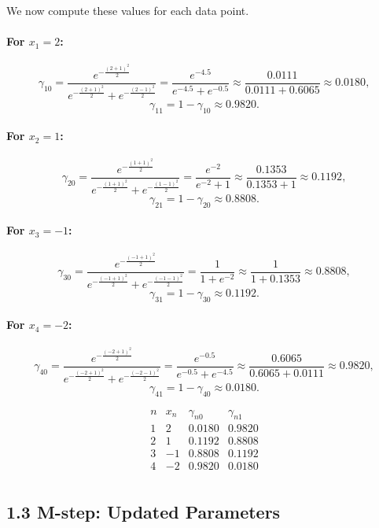 \documentclass{article}
\begin{document}
We now compute these values for each data point.

\paragraph{For $x_1 = 2$:}
\[
\gamma_{10}
= \frac{e^{-\frac{(2+1)^2}{2}}}{e^{-\frac{(2+1)^2}{2}} + e^{-\frac{(2-1)^2}{2}}}
= \frac{e^{-4.5}}{e^{-4.5}+e^{-0.5}}
\approx \frac{0.0111}{0.0111+0.6065}
\approx 0.0180,
\]
\[
\gamma_{11} = 1 - \gamma_{10} \approx 0.9820.
\]

\paragraph{For $x_2 = 1$:}
\[
\gamma_{20}
= \frac{e^{-\frac{(1+1)^2}{2}}}{e^{-\frac{(1+1)^2}{2}} + e^{-\frac{(1-1)^2}{2}}}
= \frac{e^{-2}}{e^{-2}+1}
\approx \frac{0.1353}{0.1353+1}
\approx 0.1192,
\]
\[
\gamma_{21} = 1 - \gamma_{20} \approx 0.8808.
\]

\paragraph{For $x_3 = -1$:}
\[
\gamma_{30}
= \frac{e^{-\frac{(-1+1)^2}{2}}}{e^{-\frac{(-1+1)^2}{2}} + e^{-\frac{(-1-1)^2}{2}}}
= \frac{1}{1+e^{-2}}
\approx \frac{1}{1+0.1353}
\approx 0.8808,
\]
\[
\gamma_{31} = 1 - \gamma_{30} \approx 0.1192.
\]

\paragraph{For $x_4 = -2$:}
\[
\gamma_{40}
= \frac{e^{-\frac{(-2+1)^2}{2}}}{e^{-\frac{(-2+1)^2}{2}} + e^{-\frac{(-2-1)^2}{2}}}
= \frac{e^{-0.5}}{e^{-0.5}+e^{-4.5}}
\approx \frac{0.6065}{0.6065+0.0111}
\approx 0.9820,
\]
\[
\gamma_{41} = 1 - \gamma_{40} \approx 0.0180.
\]

\[
\boxed{
\begin{array}{c|c|c|c}
n & x_n & \gamma_{n0} & \gamma_{n1} \\
\hline
1 & 2   & 0.0180 & 0.9820 \\
2 & 1   & 0.1192 & 0.8808 \\
3 & -1  & 0.8808 & 0.1192 \\
4 & -2  & 0.9820 & 0.0180 \\
\end{array}}
\]

\subsection*{1.3 M-step: Updated Parameters}
\end{document}
